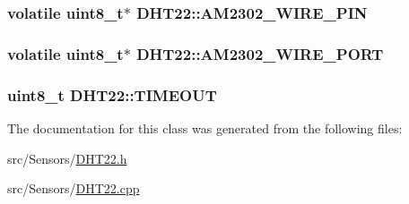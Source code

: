 \subsubsection[{\texorpdfstring{A\+M2302\+\_\+\+W\+I\+R\+E\+\_\+\+P\+IN}{AM2302_WIRE_PIN}}]{\setlength{\rightskip}{0pt plus 5cm}volatile uint8\+\_\+t$\ast$ D\+H\+T22\+::\+A\+M2302\+\_\+\+W\+I\+R\+E\+\_\+\+P\+IN\hspace{0.3cm}{\ttfamily [private]}}\hypertarget{classDHT22_a5555aa8aa95149f3a3723582bb4ceffa}{}\label{classDHT22_a5555aa8aa95149f3a3723582bb4ceffa}
\subsubsection[{\texorpdfstring{A\+M2302\+\_\+\+W\+I\+R\+E\+\_\+\+P\+O\+RT}{AM2302_WIRE_PORT}}]{\setlength{\rightskip}{0pt plus 5cm}volatile uint8\+\_\+t$\ast$ D\+H\+T22\+::\+A\+M2302\+\_\+\+W\+I\+R\+E\+\_\+\+P\+O\+RT\hspace{0.3cm}{\ttfamily [private]}}\hypertarget{classDHT22_a0966fbe5db17d7ca6f1f036830e27502}{}\label{classDHT22_a0966fbe5db17d7ca6f1f036830e27502}
\subsubsection[{\texorpdfstring{T\+I\+M\+E\+O\+UT}{TIMEOUT}}]{\setlength{\rightskip}{0pt plus 5cm}uint8\+\_\+t D\+H\+T22\+::\+T\+I\+M\+E\+O\+UT\hspace{0.3cm}{\ttfamily [private]}}\hypertarget{classDHT22_acbca744f7ed6f46e2d060c7047b0b1a4}{}\label{classDHT22_acbca744f7ed6f46e2d060c7047b0b1a4}


The documentation for this class was generated from the following files\+:\begin{DoxyCompactItemize}
\item 
src/\+Sensors/\hyperlink{DHT22_8h}{D\+H\+T22.\+h}\item 
src/\+Sensors/\hyperlink{DHT22_8cpp}{D\+H\+T22.\+cpp}\end{DoxyCompactItemize}
